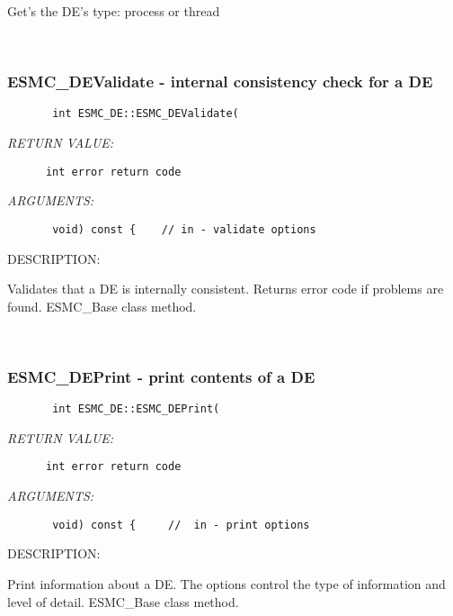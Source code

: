        Get's the DE's type: process or thread
   
 
\mbox{}\hrulefill\ 
 
\subsubsection{ESMC\_DEValidate - internal consistency check for a DE}


  
\begin{verbatim}       int ESMC_DE::ESMC_DEValidate(\end{verbatim}{\em RETURN VALUE:}
\begin{verbatim}      int error return code\end{verbatim}{\em ARGUMENTS:}
\begin{verbatim}       void) const {    // in - validate options\end{verbatim}
{\sf DESCRIPTION:\\ }


        Validates that a DE is internally consistent.
        Returns error code if problems are found.  ESMC\_Base class method.
   
 
\mbox{}\hrulefill\ 
 
\subsubsection{ESMC\_DEPrint - print contents of a DE}


  
\begin{verbatim}       int ESMC_DE::ESMC_DEPrint(\end{verbatim}{\em RETURN VALUE:}
\begin{verbatim}      int error return code\end{verbatim}{\em ARGUMENTS:}
\begin{verbatim}       void) const {     //  in - print options\end{verbatim}
{\sf DESCRIPTION:\\ }


        Print information about a DE.  The options control the
        type of information and level of detail.  ESMC\_Base class method.
   
